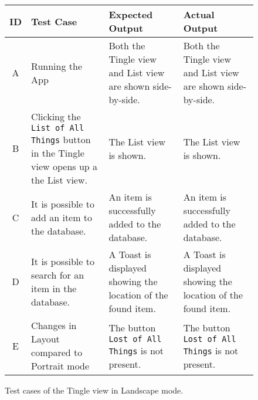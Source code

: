 \begin{figure}[H]
	\renewcommand*{\arraystretch}{1.5} %
	\begin{tabular}{| c | p{3.5cm} | p{3.5cm} | p{3.5cm} |}
		\hline
		{\textbf{ID} } & {\textbf{Test Case} } & {\textbf{Expected Output}} & {\textbf {Actual Output}} \\\hline\hline
		A & Running the App & Both the Tingle view and List view are shown side-by-side. & Both the Tingle view and List view are shown side-by-side.  \\ \hline
		B &	Clicking the \texttt{List of All Things} button in the Tingle view opens up a the List view. & The List view is shown. & The List view is shown. \\ \hline
		C & It is possible to add an item to the database. & An item is successfully added to the database. & An item is successfully added to the database. \\ \hline
		D & It is possible to search for an item in the database. & A Toast is displayed showing the location of the found item. & A Toast is displayed showing the location of the found item. \\ \hline
		E & Changes in Layout compared to Portrait mode & The button \texttt{Lost of All Things} is not present. & The button \texttt{Lost of All Things} is not present. \\ \hline
	\end{tabular}
	
	\caption{Test cases of the Tingle view in Landscape mode.}
	\label{tab:test-cases-tingle-landscape}
\end{figure}

